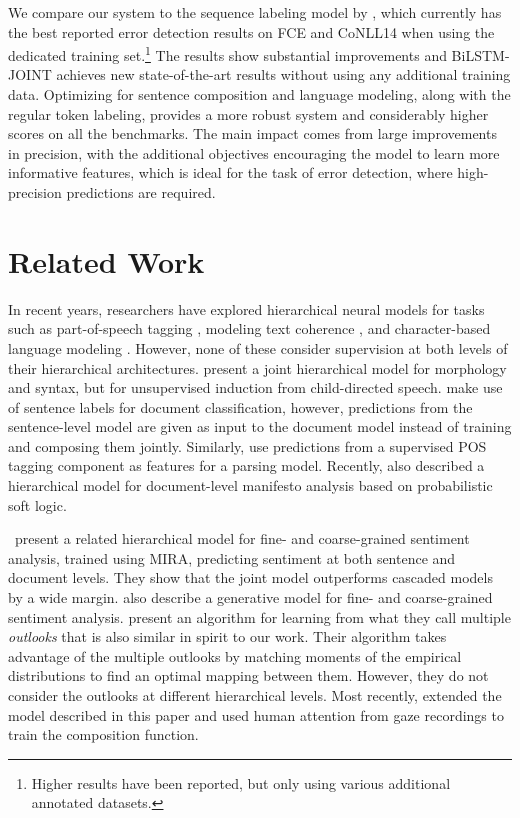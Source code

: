 \documentclass[letterpaper]{article} \usepackage{aaai19}  \usepackage{times}  \usepackage{helvet}  \usepackage{courier}  \usepackage{graphicx}
\renewcommand\cite{\citep}	\newcommand\newcite{\citet}
\begin{document}
We compare our system to the sequence labeling model by \citet{Rei2017}, which currently has the best reported error detection results on FCE and CoNLL14 when using the dedicated training set.\footnote{Higher results have been reported, but only using various additional annotated datasets.}
The results show substantial improvements and {\small BiLSTM-JOINT} achieves new state-of-the-art results without using any additional training data. Optimizing for sentence composition and language modeling, along with the regular token labeling, provides a more robust system and considerably higher  scores on all the benchmarks. The main impact comes from large improvements in precision, with the additional objectives encouraging the model to learn more informative features, which is ideal for the task of error detection, where high-precision predictions are required.









\section{Related Work}

In recent years, researchers have explored hierarchical neural models for tasks such as part-of-speech tagging \cite{Plank:ea:16}, modeling text coherence \cite{Li:ea:15}, and character-based language modeling \cite{Hermans:Schrauwen:13}. However, none of these consider supervision at both levels of their hierarchical architectures. \citet{Frank:ea:13} present a joint hierarchical model for morphology and syntax, but for unsupervised induction from child-directed speech. 
\citet{zhang2016rationale} make use of sentence labels for document classification, however, predictions from the sentence-level model are given as input to the document model instead of training and composing them jointly. 
Similarly, \citet{ammar2016many} use predictions from a supervised POS tagging component as features for a parsing model.
Recently, \citet{subramanian2018hierarchical} also described a hierarchical model for document-level manifesto analysis based on probabilistic soft logic.

\citet{McDonald:ea:07}~present a related hierarchical model for fine- and coarse-grained sentiment analysis, trained using MIRA, predicting sentiment at both sentence and document levels. They show that the joint model outperforms cascaded models by a wide margin. \citet{Zaidan:Eisner:08} also describe a generative model for fine- and coarse-grained sentiment analysis. 
\citet{Harel:Mannor:11} present an algorithm for learning from what they call multiple {\em outlooks} that is also similar in spirit to our work. Their algorithm takes advantage of the multiple outlooks by matching moments of the empirical distributions to find an optimal mapping between them. However, they do not consider the outlooks at different hierarchical levels.
Most recently, \citet{barrett2018sequence} extended the model described in this paper and used human attention from gaze recordings to train the composition function.
\end{document}
